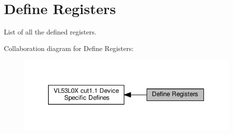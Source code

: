 \hypertarget{group__VL53L0X__DefineRegisters__group}{}\section{Define Registers}
\label{group__VL53L0X__DefineRegisters__group}


List of all the defined registers.  


Collaboration diagram for Define Registers\+:\nopagebreak
\begin{figure}[H]
\begin{center}
\leavevmode
\includegraphics[width=326pt]{group__VL53L0X__DefineRegisters__group}
\end{center}
\end{figure}
